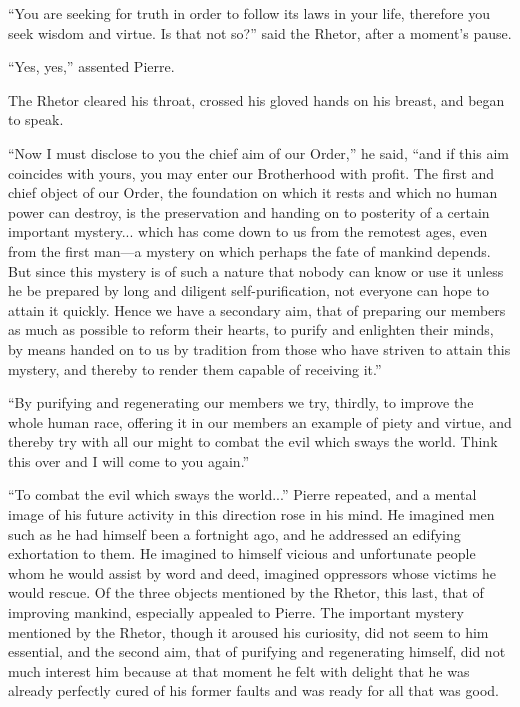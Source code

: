 ``You are seeking for truth in order to follow its laws in your
life, therefore you seek wisdom and virtue. Is that not so?''
said the Rhetor, after a moment's pause.

``Yes, yes,'' assented Pierre.

The Rhetor cleared his throat, crossed his gloved hands on his
breast, and began to speak.

``Now I must disclose to you the chief aim of our Order,'' he
said, ``and if this aim coincides with yours, you may enter our
Brotherhood with profit. The first and chief object of our Order,
the foundation on which it rests and which no human power can
destroy, is the preservation and handing on to posterity of a
certain important mystery... which has come down to us from the
remotest ages, even from the first man---a mystery on which
perhaps the fate of mankind depends. But since this mystery is of
such a nature that nobody can know or use it unless he be
prepared by long and diligent self-purification, not everyone can
hope to attain it quickly. Hence we have a secondary aim, that of
preparing our members as much as possible to reform their hearts,
to purify and enlighten their minds, by means handed on to us by
tradition from those who have striven to attain this mystery, and
thereby to render them capable of receiving it.''

``By purifying and regenerating our members we try, thirdly, to
improve the whole human race, offering it in our members an
example of piety and virtue, and thereby try with all our might
to combat the evil which sways the world. Think this over and I
will come to you again.''

``To combat the evil which sways the world...'' Pierre repeated,
and a mental image of his future activity in this direction rose
in his mind.  He imagined men such as he had himself been a
fortnight ago, and he addressed an edifying exhortation to
them. He imagined to himself vicious and unfortunate people whom
he would assist by word and deed, imagined oppressors whose
victims he would rescue. Of the three objects mentioned by the
Rhetor, this last, that of improving mankind, especially appealed
to Pierre. The important mystery mentioned by the Rhetor, though
it aroused his curiosity, did not seem to him essential, and the
second aim, that of purifying and regenerating himself, did not
much interest him because at that moment he felt with delight
that he was already perfectly cured of his former faults and was
ready for all that was good.

